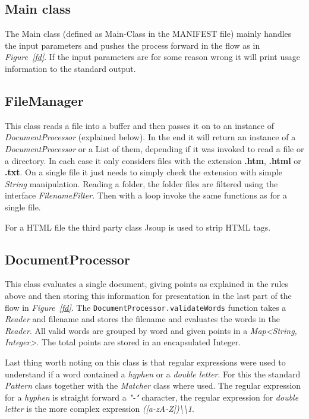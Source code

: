 \documentclass[a4paper]{article}
\begin{document}
\subsection{Main class}
The Main class (defined as Main-Class in the MANIFEST file) mainly handles the input parameters and pushes the process forward in the flow as in \textit{Figure~\ref{fd}}. If the input parameters are for some reason wrong it will print usage information to the standard output.

\subsection{FileManager}
This class reads a file into a buffer and then passes it on to an instance of \textit{DocumentProcessor} (explained below). In the end it will return an instance of a \textit{DocumentProcessor} or a List of them, depending if it was invoked to read a file or a directory. In each case it only considers files with the extension {\bf.htm}, {\bf.html} or {\bf.txt}. On a single file it just needs to simply check the extension with simple \textit{String} manipulation. Reading a folder, the folder files are filtered using the interface \textit{FilenameFilter}. Then with a loop invoke the same functions as for a single file. 

For a HTML file the third party class Jsoup is used to strip HTML tags\cite{jsoup}.

\subsection{DocumentProcessor}
This class evaluates a single document, giving points as explained in the rules above and then storing this information for presentation in the last part of the flow in \textit{Figure~\ref{fd}}. The \verb:DocumentProcessor.validateWords: function takes a \textit{Reader} and filename and stores the filename and evaluates the words in the \textit{Reader}. All valid words are grouped by word and given points in a \textit{Map<String, Integer>}. The total points are stored in an encapsulated Integer.

Last thing worth noting on this class is that regular expressions were used to understand if a word contained a \textit{hyphen} or a \textit{double letter}. For this the standard \textit{Pattern} class together with the \textit{Matcher} class where used. The regular expression for a \textit{hyphen} is straight forward a \textit{"-"} character, the regular expression for \textit{double letter} is the more complex expression \textit{([a-zA-Z])\textbackslash\textbackslash1}.
\end{document}
